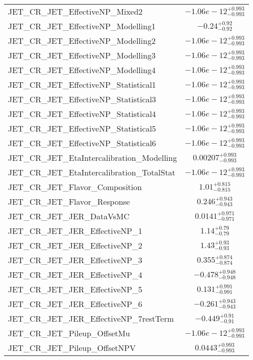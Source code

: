 \begin{tabular}{|l|c|}
JET\_CR\_JET\_EffectiveNP\_Mixed2 & $-1.06e-12^{+0.993}_{-0.993}$ \\
JET\_CR\_JET\_EffectiveNP\_Modelling1 & $-0.24^{+0.92}_{-0.92}$ \\
JET\_CR\_JET\_EffectiveNP\_Modelling2 & $-1.06e-12^{+0.993}_{-0.993}$ \\
JET\_CR\_JET\_EffectiveNP\_Modelling3 & $-1.06e-12^{+0.993}_{-0.993}$ \\
JET\_CR\_JET\_EffectiveNP\_Modelling4 & $-1.06e-12^{+0.993}_{-0.993}$ \\
JET\_CR\_JET\_EffectiveNP\_Statistical1 & $-1.06e-12^{+0.993}_{-0.993}$ \\
JET\_CR\_JET\_EffectiveNP\_Statistical3 & $-1.06e-12^{+0.993}_{-0.993}$ \\
JET\_CR\_JET\_EffectiveNP\_Statistical4 & $-1.06e-12^{+0.993}_{-0.993}$ \\
JET\_CR\_JET\_EffectiveNP\_Statistical5 & $-1.06e-12^{+0.993}_{-0.993}$ \\
JET\_CR\_JET\_EffectiveNP\_Statistical6 & $-1.06e-12^{+0.993}_{-0.993}$ \\
JET\_CR\_JET\_EtaIntercalibration\_Modelling & $0.00207^{+0.993}_{-0.993}$ \\
JET\_CR\_JET\_EtaIntercalibration\_TotalStat & $-1.06e-12^{+0.993}_{-0.993}$ \\
JET\_CR\_JET\_Flavor\_Composition & $1.01^{+0.815}_{-0.815}$ \\
JET\_CR\_JET\_Flavor\_Response & $0.246^{+0.943}_{-0.943}$ \\
JET\_CR\_JET\_JER\_DataVsMC & $0.0141^{+0.971}_{-0.971}$ \\
JET\_CR\_JET\_JER\_EffectiveNP\_1 & $1.14^{+0.79}_{-0.79}$ \\
JET\_CR\_JET\_JER\_EffectiveNP\_2 & $1.43^{+0.93}_{-0.93}$ \\
JET\_CR\_JET\_JER\_EffectiveNP\_3 & $0.355^{+0.874}_{-0.874}$ \\
JET\_CR\_JET\_JER\_EffectiveNP\_4 & $-0.478^{+0.948}_{-0.948}$ \\
JET\_CR\_JET\_JER\_EffectiveNP\_5 & $0.131^{+0.991}_{-0.991}$ \\
JET\_CR\_JET\_JER\_EffectiveNP\_6 & $-0.261^{+0.943}_{-0.943}$ \\
JET\_CR\_JET\_JER\_EffectiveNP\_7restTerm & $-0.449^{+0.91}_{-0.91}$ \\
JET\_CR\_JET\_Pileup\_OffsetMu & $-1.06e-12^{+0.993}_{-0.993}$ \\
JET\_CR\_JET\_Pileup\_OffsetNPV & $0.0443^{+0.993}_{-0.993}$ \\

\end{tabular}
